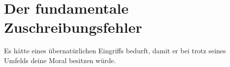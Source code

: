 \chapter{Der fundamentale Zuschreibungsfehler}

\begin{chapterOpeningQuote}
Es hätte eines übernatürlichen Eingriffs bedurft, damit er bei trotz seines Umfelds deine Moral besitzen würde.
\end{chapterOpeningQuote}

